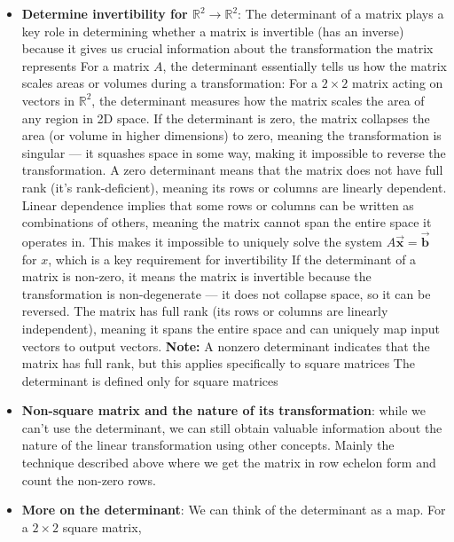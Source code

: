 \documentclass{report}
\begin{document}
\begin{itemize}
            \item \textbf{Determine invertibility for $\mathbb{R}^{2} \to \mathbb{R}^{2} $}: The determinant of a matrix plays a key role in determining whether a matrix is invertible (has an inverse) because it gives us crucial information about the transformation the matrix represents
                \bigbreak \noindent 
                For a matrix $A$, the determinant essentially tells us how the matrix scales areas or volumes during a transformation:
                \bigbreak \noindent 
                For a $2\times2$ matrix acting on vectors in $\mathbb{R}^{2}$, the determinant measures how the matrix scales the area of any region in 2D space.
                \bigbreak \noindent 
                If the determinant is zero, the matrix collapses the area (or volume in higher dimensions) to zero, meaning the transformation is singular — it squashes space in some way, making it impossible to reverse the transformation.
                \bigbreak \noindent 
                A zero determinant means that the matrix does not have full rank (it's rank-deficient), meaning its rows or columns are linearly dependent. Linear dependence implies that some rows or columns can be written as combinations of others, meaning the matrix cannot span the entire space it operates in. This makes it impossible to uniquely solve the system $A\vec{\mathbf{x}}=\vec{\mathbf{b}}$ for $x$, which is a key requirement for invertibility
                \bigbreak \noindent 
                If the determinant of a matrix is non-zero, it means the matrix is invertible because the transformation is non-degenerate — it does not collapse space, so it can be reversed.
                \bigbreak \noindent 
                The matrix has full rank (its rows or columns are linearly independent), meaning it spans the entire space and can uniquely map input vectors to output vectors.
                \bigbreak \noindent 
                \textbf{Note:} A nonzero determinant indicates that the matrix has full rank, but this applies specifically to square matrices
                \bigbreak \noindent 
                The determinant is defined only for square matrices
            \item \textbf{Non-square matrix and the nature of its transformation}: while we can't use the determinant, we can still obtain valuable information about the nature of the linear transformation using other concepts. Mainly the technique described above where we get the matrix in row echelon form and count the non-zero rows.
            \item \textbf{More on the determinant}: We can think of the determinant as a map. For a $2\times 2$ square matrix,

\end{itemize}
\end{document}
